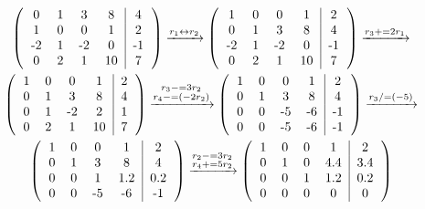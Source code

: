 \documentclass{article}
\begin{document}
\begin{gather*}
    \left(
        \begin{tabular}{ c c c c|c }
            0 & 1 & 3 & 8 & 4\\
            1 & 0 & 0 & 1 & 2\\
            -2 & 1 & -2 & 0 & -1\\
            0 & 2 & 1 & 10 & 7
        \end{tabular}
    \right)
    \xrightarrow{r_1 \leftrightarrow r_2}
    \left(
        \begin{tabular}{ c c c c|c }
            1 & 0 & 0 & 1 & 2\\
            0 & 1 & 3 & 8 & 4\\
            -2 & 1 & -2 & 0 & -1\\
            0 & 2 & 1 & 10 & 7
        \end{tabular}
    \right)
    \xrightarrow{r_3 += 2r_1}
    \\
    \left(
        \begin{tabular}{ c c c c|c }
            1 & 0 & 0 & 1 & 2\\
            0 & 1 & 3 & 8 & 4\\
            0 & 1 & -2 & 2 & 1\\
            0 & 2 & 1 & 10 & 7
        \end{tabular}
    \right)
    \xrightarrow{
        \substack{
            r_3 -= 3r_2\\
            r_4 -= (-2r_2)
        }
    }
    \left(
        \begin{tabular}{ c c c c|c }
            1 & 0 & 0 & 1 & 2\\
            0 & 1 & 3 & 8 & 4\\
            0 & 0 & -5 & -6 & -1\\
            0 & 0 & -5 & -6 & -1
        \end{tabular}
    \right)
    \xrightarrow{r_3 /= (-5)}
    \\
    \left(
        \begin{tabular}{ c c c c|c }
            1 & 0 & 0 & 1 & 2\\
            0 & 1 & 3 & 8 & 4\\
            0 & 0 & 1 & 1.2 & 0.2\\
            0 & 0 & -5 & -6 & -1
        \end{tabular}
    \right)
    \xrightarrow{
        \substack{
            r_2 -= 3r_2\\
            r_4 += 5r_2
        }
    }
    \left(
        \begin{tabular}{ c c c c|c }
            1 & 0 & 0 & 1 & 2\\
            0 & 1 & 0 & 4.4 & 3.4\\
            0 & 0 & 1 & 1.2 & 0.2\\
            0 & 0 & 0 & 0 & 0
        \end{tabular}
    \right)
\end{gather*}
\end{document}
